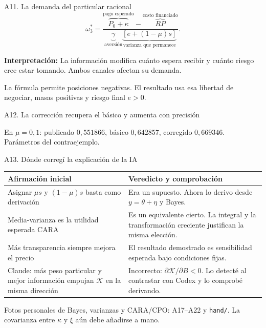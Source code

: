 \documentclass[aspectratio=169,11pt]{beamer}
\newcommand{\K}{\mathcal K}
\newcommand{\idea}[1]{\par\medskip\textbf{Interpretación:} #1}
\begin{document}
\begin{frame}{A11. La demanda del particular racional}
\[
 \omega_3^*=
 \frac{\overbrace{P_0+\kappa}^{\text{pago esperado}}-
       \overbrace{RP}^{\text{costo financiado}}}
 {\underbrace{\gamma}_{\text{aversión}}
  \underbrace{[e+(1-\mu)s]}_{\text{varianza que permanece}}}.
\]
\idea{La información modifica cuánto espera recibir y cuánto riesgo cree
estar tomando. Ambos canales afectan su demanda.}
\medskip\par
La fórmula permite posiciones negativas. El resultado usa esa libertad
de negociar, masas positivas y riesgo final \(e>0\).
\end{frame}

\begin{frame}{A12. La corrección recupera el básico y aumenta con precisión}
\begin{center}
\resizebox{0.83\textwidth}{!}{}
\end{center}
\small
En \(\mu=0{,}1\): publicado \(0{,}551866\), básico \(0{,}642857\),
corregido \(0{,}669346\). Parámetros del contraejemplo.
\end{frame}

\begin{frame}{A13. Dónde corregí la explicación de la IA}
\begin{center}\small
\begin{tabular}{p{4.6cm}p{6.7cm}}
\toprule
Afirmación inicial & Veredicto y comprobación\\
\midrule
Asignar \(\mu s\) y \((1-\mu)s\) basta como derivación
& Era un supuesto. Ahora lo derivo desde \(y=\theta+\eta\) y Bayes.\\[0.15cm]
Media-varianza es la utilidad esperada CARA
& Es un equivalente cierto. La integral y la transformación creciente
justifican la misma elección.\\[0.15cm]
Más transparencia siempre mejora el precio
& El resultado demostrado es sensibilidad esperada bajo condiciones fijas.\\[0.15cm]
Claude: más peso particular y mejor información empujan \(\K\) en la misma dirección
& Incorrecto: \(\partial\K/\partial B<0\). Lo detecté al contrastar con Codex
y lo comprobé derivando.\\
\bottomrule
\end{tabular}
\end{center}
\normalsize
Fotos personales de Bayes, varianzas y CARA/CPO: A17--A22 y \texttt{hand/}.
La covarianza entre \(\kappa\) y \(\xi\) aún debe añadirse a mano.
\end{frame}
\end{document}
